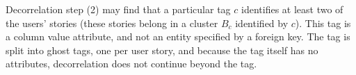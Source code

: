 Decorrelation step (2) may find that a particular tag $c$ identifies at least two of the users'
stories (these stories belong in a cluster $B_c$ identified by $c$). This tag is a column value
attribute, and not an entity specified by a foreign key. The tag is split into ghost tags, one per
user story, and because the tag itself has no attributes, decorrelation does not continue beyond the
tag.
\fi

